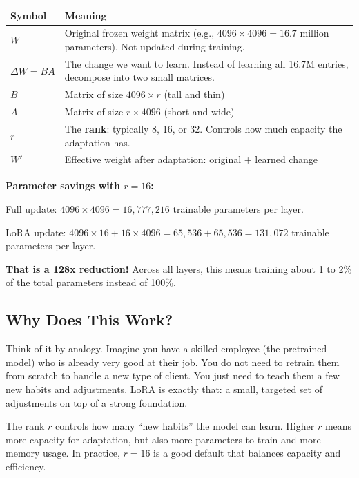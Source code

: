 \begin{chapterenv}
\begin{infobox}
\begin{center}
\begin{tabular}{p{}p{}}
\toprule
\textbf{Symbol} & \textbf{Meaning} \\
\midrule
$W$ & Original frozen weight matrix (e.g., $4096 \times 4096 = 16.7$ million parameters). Not updated during training. \\
$\Delta W = BA$ & The change we want to learn. Instead of learning all 16.7M entries, decompose into two small matrices. \\
$B$ & Matrix of size $4096 \times r$ (tall and thin) \\
$A$ & Matrix of size $r \times 4096$ (short and wide) \\
$r$ & The \textbf{rank}: typically 8, 16, or 32. Controls how much capacity the adaptation has. \\
$W'$ & Effective weight after adaptation: original + learned change \\
\bottomrule
\end{tabular}
\end{center}

\textbf{Parameter savings with $r = 16$:}

Full update: $4096 \times 4096 = 16{,}777{,}216$ trainable parameters per layer.

LoRA update: $4096 \times 16 + 16 \times 4096 = 65{,}536 + 65{,}536 = 131{,}072$ trainable parameters per layer.

\textbf{That is a 128x reduction!} Across all layers, this means training about 1 to 2\% of the total parameters instead of 100\%.
\end{infobox}

\subsection{Why Does This Work?}

Think of it by analogy. Imagine you have a skilled employee (the pretrained model) who is already very good at their job. You do not need to retrain them from scratch to handle a new type of client. You just need to teach them a few new habits and adjustments. LoRA is exactly that: a small, targeted set of adjustments on top of a strong foundation.

The rank $r$ controls how many ``new habits'' the model can learn. Higher $r$ means more capacity for adaptation, but also more parameters to train and more memory usage. In practice, $r = 16$ is a good default that balances capacity and efficiency.


\end{chapterenv}
